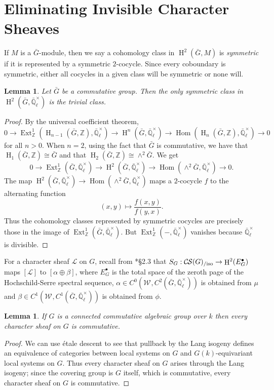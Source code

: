 \documentclass[10pt]{amsart}
\theoremstyle{plain}
\newtheorem{lemma}[theorem]{Lemma}
\theoremstyle{definition}
\newcommand{\ZZ}{{\mathbb{Z}}}
\newcommand{\EE}{\mathbb{\bar Q}_\ell}
\newcommand{\Fq}{k}
\newcommand{\EEx}{\EE^\times}
\newcommand{\Weil}[1]{\mathcal{W}_{#1}}
\DeclareMathOperator{\Hom}{Hom}
\DeclareMathOperator{\Ext}{Ext}
\DeclareMathOperator{\Hh}{H}
\newcommand{\cs}[1]{{\mathcal{#1}}}
\newcommand{\CS}{{\mathcal{C\hskip-0.8pt S}}}
\newcommand{\CSiso}[1]{\CS(#1)_{/\text{iso}}}
\newcommand{\bG}{\bar{G}}
\begin{document}
\section{Eliminating Invisible Character Sheaves}\label{sec:defect}

If $M$ is a $\bG$-module, then we say a cohomology class in $\Hh^2(\bG, M)$ is \emph{symmetric} if it is represented
by a symmetric $2$-cocycle.  Since every coboundary is symmetric, either all cocycles in a given class will be symmetric
or none will.

\begin{lemma} \label{lem:symtriv}
Let $\bG$ be a commutative group.  Then the only symmetric class in $\Hh^2(\bG, \EEx)$ is the trivial class.
\end{lemma}

\begin{proof}
By the universal coefficient theorem,
\[
0 \to \Ext^1_\ZZ(\Hh_{n-1}(\bG, \ZZ), \EEx) \to \Hh^n(\bG, \EEx) \to \Hom(\Hh_n(\bG, \ZZ), \EEx) \to 0
\]
for all $n > 0$.  When $n = 2$, using the fact that $\bG$ is commutative, we have that $\Hh_1(\bG, \ZZ) \cong \bG$
and that $\Hh_2(\bG, \ZZ) \cong \wedge^2 \bG$. We get
\[
0 \to \Ext^1_\ZZ(\bG, \EEx) \to \Hh^2(\bG, \EEx) \to \Hom(\wedge^2 \bG, \EEx) \to 0.
\]
The map $\Hh^2(\bG, \EEx) \to \Hom(\wedge^2 \bG, \EEx)$ maps a $2$-cocycle $f$ to the alternating function
\[
(x,y) \mapsto \frac{f(x,y)}{f(y,x)}.
\]
Thus the cohomology classes represented by symmetric cocycles are precisely those in the image of $\Ext^1_\ZZ(\bG, \EEx)$.
But $\Ext^1_\ZZ(-, \EEx)$ vanishes because $\EEx$ is divisible.
\end{proof}

For a character sheaf $\cs{L}$ on $G$, recall from \cite{cunningham-roe:13a}*{\S 2.3} that $S_G : \CSiso{G} \to \Hh^2(E_G^\bullet)$ maps
$[\cs{L}]$ to $[\alpha \oplus \beta]$, where $E_G^\bullet$ is the total space of the zeroth page
of the Hochschild-Serre spectral sequence, $\alpha \in C^0(\Weil{}, C^2(\bG, \EEx))$ is obtained from $\mu$ and
$\beta \in C^1(\Weil{}, C^1(\bG, \EEx))$ is obtained from $\phi$.

\begin{lemma} \label{lem:conncomm}
If $G$ is a connected commutative algebraic group over $\Fq$ then every character sheaf on $G$ is commutative.
\end{lemma}

\begin{proof}
We can use \'etale descent to see that pullback by the Lang isogeny defines an equivalence
of categories between local systems on $G$ and $G(\Fq)$-equivariant local systems on $G$.  Thus every character
sheaf on $G$ arises through the Lang isogeny; since the covering group is $G$ itself, which is commutative,
every character sheaf on $G$ is commutative.
\end{proof}
\end{document}
